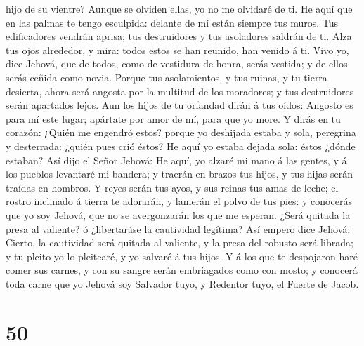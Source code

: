 hijo de su vientre? Aunque se olviden ellas, yo no me olvidaré de ti.
 He aquí que en las palmas te tengo esculpida: delante de
mí están siempre tus muros.  Tus edificadores vendrán
aprisa; tus destruidores y tus asoladores saldrán de ti. 
Alza tus ojos alrededor, y mira: todos estos se han reunido, han venido
á ti. Vivo yo, dice Jehová, que de todos, como de vestidura de honra,
serás vestida; y de ellos serás ceñida como novia. 
Porque tus asolamientos, y tus ruinas, y tu tierra desierta, ahora será
angosta por la multitud de los moradores; y tus destruidores serán
apartados lejos.  Aun los hijos de tu orfandad dirán á
tus oídos: Angosto es para mí este lugar; apártate por amor de mí, para
que yo more.  Y dirás en tu corazón: ¿Quién me engendró
estos? porque yo deshijada estaba y sola, peregrina y desterrada: ¿quién
pues crió éstos? He aquí yo estaba dejada sola: éstos ¿dónde estaban?
 Así dijo el Señor Jehová: He aquí, yo alzaré mi mano á
las gentes, y á los pueblos levantaré mi bandera; y traerán en brazos
tus hijos, y tus hijas serán traídas en hombros.  Y reyes
serán tus ayos, y sus reinas tus amas de leche; el rostro inclinado á
tierra te adorarán, y lamerán el polvo de tus pies: y conocerás que yo
soy Jehová, que no se avergonzarán los que me esperan. 
¿Será quitada la presa al valiente? ó ¿libertaráse la cautividad
legítima?  Así empero dice Jehová: Cierto, la cautividad
será quitada al valiente, y la presa del robusto será librada; y tu
pleito yo lo pleitearé, y yo salvaré á tus hijos.  Y á
los que te despojaron haré comer sus carnes, y con su sangre serán
embriagados como con mosto; y conocerá toda carne que yo Jehová soy
Salvador tuyo, y Redentor tuyo, el Fuerte de Jacob.

\hypertarget{section-49}{%
\section{50}\label{section-49}}

